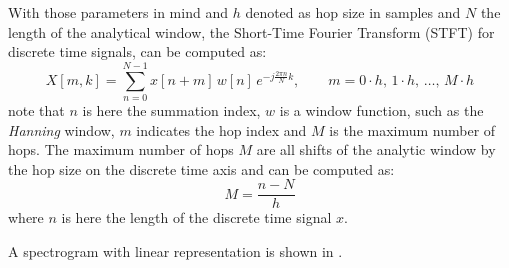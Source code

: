 With those parameters in mind and $h$ denoted as hop size in samples and $N$ the length of the analytical window, the Short-Time Fourier Transform (STFT) for discrete time signals, can be computed as:
\begin{equation}\label{eq:signal_spec_stft}
    X[m, k] = \sum_{n=0}^{N-1} x[n + m] \, w[n] \, e^{-j\frac{2 \pi n}{N}k}, \qquad m = 0 \cdot h, \, 1 \cdot h, \, \dots, \, M \cdot h 
\end{equation}
note that $n$ is here the summation index, $w$ is a window function, such as the \emph{Hanning} window, $m$ indicates the hop index and $M$ is the maximum number of hops.
The maximum number of hops $M$ are all shifts of the analytic window by the hop size on the discrete time axis and can be computed as:
\begin{equation}\label{eq:signal_spec_hop}
  M = \frac{n-N}{h}
\end{equation}
where $n$ is here the length of the discrete time signal $x$.








A spectrogram with linear representation is shown in .

